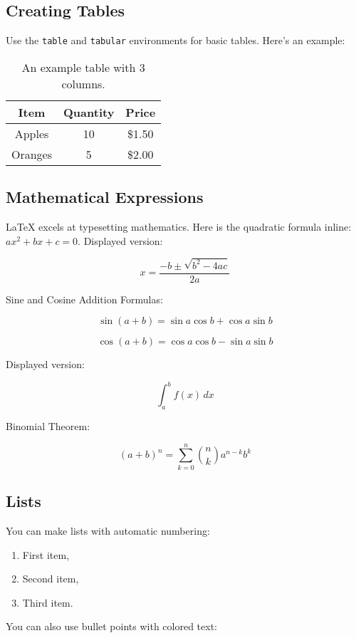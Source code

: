 \documentclass{article}
\begin{document}
	\subsection{Creating Tables}
	Use the \texttt{table} and \texttt{tabular} environments for basic tables. Here’s an example:
	
	\begin{table}[h]
		\centering
		\begin{tabular}{|c|c|c|}
			\hline
			Item & Quantity & Price \\
			\hline
			Apples & 10 & \$1.50 \\
			Oranges & 5 & \$2.00 \\
			\hline
		\end{tabular}
		\caption{An example table with 3 columns.}
	\end{table}
	
	\subsection{Mathematical Expressions}
	LaTeX excels at typesetting mathematics. Here is the quadratic formula inline: \(ax^2 + bx + c = 0\). Displayed version:
	
	\[
	x = \frac{-b \pm \sqrt{b^2 - 4ac}}{2a}
	\]
	
	Sine and Cosine Addition Formulas:
	
	\[
	\sin(a + b) = \sin a \cos b + \cos a \sin b
	\]
	
	\[
	\cos(a + b) = \cos a \cos b - \sin a \sin b
	\]
	
	Displayed version:
	
	\[
	\int_a^b f(x) \, dx
	\]
	
	Binomial Theorem:
	
	\[
	(a + b)^n = \sum_{k=0}^n \binom{n}{k} a^{n-k} b^k
	\]
	
	\subsection{Lists}
	You can make lists with automatic numbering:
	
	\begin{enumerate}
		\item First item,
		\item Second item,
		\item Third item.
	\end{enumerate}
	
	You can also use bullet points with colored text:
	
\end{document}
